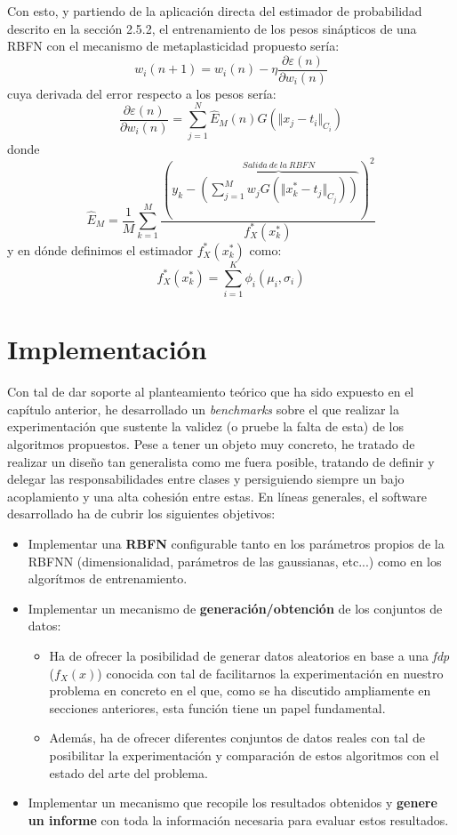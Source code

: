 \documentclass[10pt,a4paper]{report}
\begin{document}
Con esto, y partiendo de la aplicación directa del estimador de probabilidad descrito en la sección 2.5.2, el entrenamiento de los pesos sinápticos de una RBFN con el mecanismo de metaplasticidad propuesto sería:
\begin{equation}
	w_i(n+1)=w_i(n) - \eta \dfrac{\partial\varepsilon(n)}{\partial w_i(n)}
\end{equation} 
cuya derivada del error respecto a los pesos sería:
\begin{equation}
	\dfrac{\partial\varepsilon(n)}{\partial w_i(n)} = \sum^N_{j=1}{\widehat{E}_M(n) G(\Vert x_j - t_i \Vert_{C_i})}
\end{equation}
donde
\begin{equation}
	\widehat{E}_M=\dfrac{1}{M}\sum^M_{k=1}\dfrac{(y_k - \overbrace{\left(\sum^M_{j=1}{w_j G(\Vert x^*_k - t_j \Vert_{C_j})}\right)}^{Salida\ de\ la\ RBFN})^2}{f^*_X(x^*_k)}
\end{equation}
y en dónde definimos el estimador $f^*_X(x^*_k)$ como:
\begin{equation}
	f^*_X(x^*_k) = \sum^K_{i=1}\phi_i(\mu_i,\sigma_i)
\end{equation}


\chapter{Implementación}
Con tal de dar soporte al planteamiento teórico que ha sido expuesto en el capítulo anterior, he desarrollado un \textit{benchmarks} sobre el que realizar la experimentación que sustente la validez (o pruebe la falta de esta) de los algoritmos propuestos. Pese a tener un objeto muy concreto, he tratado de realizar un diseño tan generalista como me fuera posible, tratando de definir y delegar las responsabilidades entre clases y persiguiendo siempre un bajo acoplamiento y una alta cohesión entre estas.
En líneas generales, el software desarrollado ha de cubrir los siguientes objetivos:
\begin{itemize}
	\item Implementar una \textbf{RBFN} configurable tanto en los parámetros propios de la RBFNN (dimensionalidad, parámetros de las gaussianas, etc...) como en los algorítmos de entrenamiento.
	\item Implementar un mecanismo de \textbf{generación/obtención} de los conjuntos de datos:
	\begin{itemize}
		\item Ha de ofrecer la posibilidad de generar datos aleatorios en base a una \textit{fdp} ($f_X(x)$) conocida con tal de facilitarnos la experimentación en nuestro problema en concreto en el que, como se ha discutido ampliamente en secciones anteriores, esta función tiene un papel fundamental.
		\item Además, ha de ofrecer diferentes conjuntos de datos reales con tal de posibilitar la experimentación y comparación de estos algoritmos con el estado del arte del problema.
	\end{itemize}
	\item Implementar un mecanismo que recopile los resultados obtenidos y \textbf{genere un informe} con toda la información necesaria para evaluar estos resultados.
\end{itemize}
\end{document}
